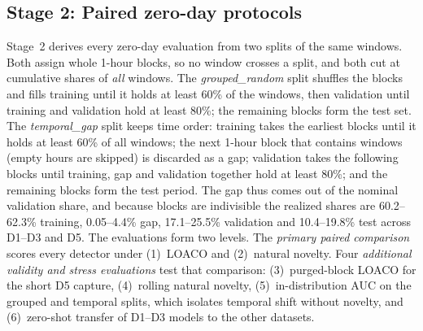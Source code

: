\documentclass[conference]{IEEEtran}
\begin{document}
\subsection{Stage 2: Paired zero-day protocols}
\label{sec:s2}
Stage~2 derives every zero-day evaluation from two splits of the same windows. Both assign whole 1-hour blocks, so no window crosses a split, and both cut at cumulative shares of \emph{all} windows. The \emph{grouped\_random} split shuffles the blocks and fills training until it holds at least 60\% of the windows, then validation until training and validation hold at least 80\%; the remaining blocks form the test set. The \emph{temporal\_gap} split keeps time order: training takes the earliest blocks until it holds at least 60\% of all windows; the next 1-hour block that contains windows (empty hours are skipped) is discarded as a gap; validation takes the following blocks until training, gap and validation together hold at least 80\%; and the remaining blocks form the test period. The gap thus comes out of the nominal validation share, and because blocks are indivisible the realized shares are 60.2--62.3\% training, 0.05--4.4\% gap, 17.1--25.5\% validation and 10.4--19.8\% test across D1--D3 and D5. The evaluations form two levels. The \emph{primary paired comparison} scores every detector under (1)~LOACO and (2)~natural novelty. Four \emph{additional validity and stress evaluations} test that comparison: (3)~purged-block LOACO for the short D5 capture, (4)~rolling natural novelty, (5)~in-distribution AUC on the grouped and temporal splits, which isolates temporal shift without novelty, and (6)~zero-shot transfer of D1--D3 models to the other datasets.
\end{document}
